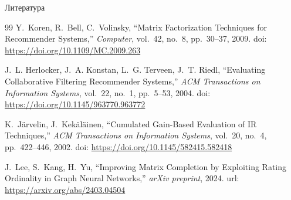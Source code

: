 \documentclass{beamer}
\begin{document}
\begin{frame}[allowframebreaks]{Литература}
\begin{thebibliography}{99}
Y.~Koren, R.~Bell, C.~Volinsky,
``Matrix Factorization Techniques for Recommender Systems,''
\textit{Computer},
vol.~42, no.~8, pp.~30--37, 2009.
doi: \url{https://doi.org/10.1109/MC.2009.263}

J.~L. Herlocker, J.~A. Konstan, L.~G. Terveen, J.~T. Riedl,
``Evaluating Collaborative Filtering Recommender Systems,''
\textit{ACM Transactions on Information Systems},
vol.~22, no.~1, pp.~5--53, 2004.
doi: \url{https://doi.org/10.1145/963770.963772}

K.~J{\"a}rvelin, J.~Kek{\"a}l{\"a}inen,
``Cumulated Gain-Based Evaluation of IR Techniques,''
\textit{ACM Transactions on Information Systems},
vol.~20, no.~4, pp.~422--446, 2002.
doi: \url{https://doi.org/10.1145/582415.582418}

J.~Lee, S.~Kang, H.~Yu,
``Improving Matrix Completion by Exploiting Rating Ordinality in Graph Neural Networks,''
\textit{arXiv preprint}, 2024.
url: \url{https://arxiv.org/abs/2403.04504}

\end{thebibliography}
\end{frame}
\end{document}

